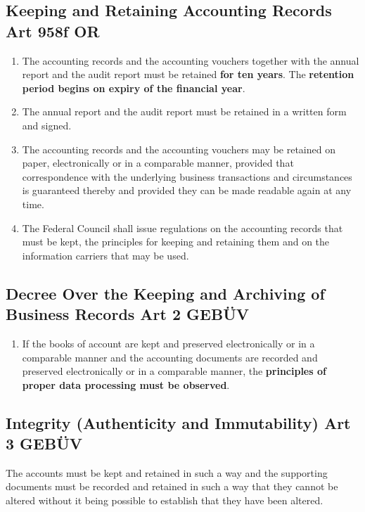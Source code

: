 \documentclass[11pt]{article}
\theoremstyle{definition}
\begin{document}
\subsection{Keeping and Retaining Accounting Records Art 958f OR}
\begin{enumerate}[label=\arabic* ]
	\item The accounting records and the accounting vouchers together with the annual report and the audit report must be retained \textbf{for ten years}. The \textbf{retention period begins on expiry of the financial year}.
	\item The annual report and the audit report must be retained in a written form and signed.
	\item The accounting records and the accounting vouchers may be retained on paper, electronically or in a comparable manner, provided that correspondence with the underlying business transactions and circumstances is guaranteed thereby and provided they can be made readable again at any time.
	\item The Federal Council shall issue regulations on the accounting records that must be kept, the principles for keeping and retaining them and on the information carriers that may be used.
\end{enumerate}

\subsection{Decree Over the Keeping and Archiving of Business Records Art 2 GEBÜV}
\begin{enumerate}[label=\arabic* ,start=2]
	\item If the books of account are kept and preserved electronically or in a comparable manner and the accounting documents are recorded and preserved electronically or in a comparable manner, the \textbf{principles of proper data processing must be observed}.
\end{enumerate}

\subsection{Integrity (Authenticity and Immutability) Art 3 GEBÜV}
The accounts must be kept and retained in such a way and the supporting documents must be recorded and retained in such a way that they cannot be altered without it being possible to establish that they have been altered.
\end{document}
